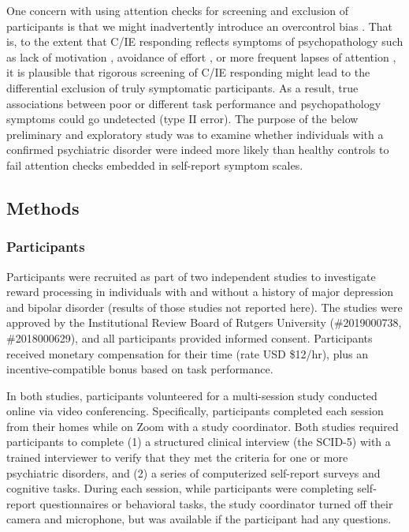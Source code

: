 \documentclass[a4paper,notitlepage,12pt]{article}
\begin{document}
One concern with using attention checks for screening and exclusion of participants is that we might inadvertently introduce an overcontrol bias \cite{elwert2014endogenous-2}. That is, to the extent that C/IE responding reflects symptoms of psychopathology such as lack of motivation \cite{barch2015mechanisms-2}, avoidance of effort \cite{cohen2001impairments-2, culbreth2016negative-2}, or more frequent lapses of attention \cite{kane2016individual-2, robison2017neurotic-2}, it is plausible that rigorous screening of C/IE responding might lead to the differential exclusion of truly symptomatic participants. As a result, true associations between poor or different task performance and psychopathology symptoms could go undetected (type II error). The purpose of the below preliminary and exploratory study was to examine whether individuals with a confirmed psychiatric disorder were indeed more likely than healthy controls to fail attention checks embedded in self-report symptom scales.  

\subsection*{Methods}

\subsubsection*{Participants}

Participants were recruited as part of two independent studies to investigate reward processing in individuals with and without a history of major depression and bipolar disorder (results of those studies not reported here). The studies were approved by the Institutional Review Board of Rutgers University (\#2019000738, \#2018000629), and all participants provided informed consent. Participants received monetary compensation for their time (rate USD \$12/hr), plus an incentive-compatible bonus based on task performance. 

In both studies, participants volunteered for a multi-session study conducted online via video conferencing. Specifically, participants completed each session from their homes while on Zoom with a study coordinator. Both studies required participants to complete (1) a structured clinical interview (the SCID-5) with a trained interviewer to verify that they met the criteria for one or more psychiatric disorders, and (2) a series of computerized self-report surveys and cognitive tasks. During each session, while participants were completing self-report questionnaires or behavioral tasks, the study coordinator turned off their camera and microphone, but was available if the participant had any questions. 
\end{document}
